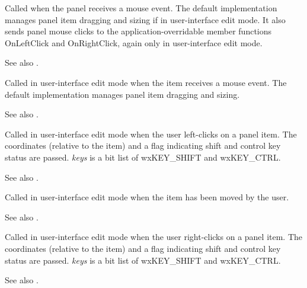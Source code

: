 

Called  when the panel receives a mouse event.
The default implementation manages panel item dragging and sizing if in user-interface edit mode.
It also sends panel mouse clicks to the application-overridable member functions OnLeftClick
and OnRightClick, again only in user-interface edit mode.

See also .



Called in user-interface edit mode when the item receives a mouse event.
The default implementation manages panel item dragging and sizing.

See also .



Called in user-interface edit mode when the user left-clicks on a panel item.
The coordinates (relative to the item) and a flag indicating shift and control
key status are passed. {\it keys} is a bit list of wxKEY\_SHIFT and wxKEY\_CTRL.

See also .



Called in user-interface edit mode when the item has been moved by the user.

See also .



Called in user-interface edit mode when the user right-clicks on a panel item.
The coordinates (relative to the item) and a flag indicating shift and control
key status are passed. {\it keys} is a bit list of wxKEY\_SHIFT and wxKEY\_CTRL.

See also .

